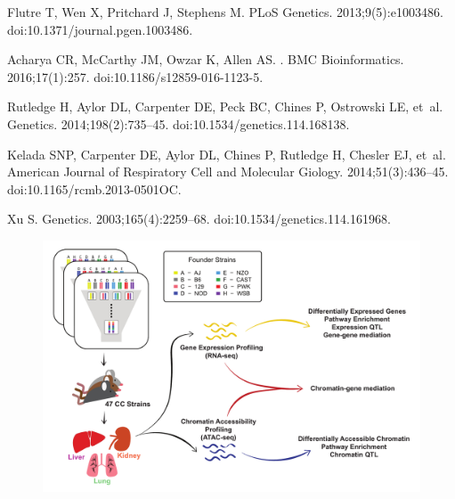 \documentclass[10pt,letterpaper]{article}
\begin{document}
\begin{thebibliography}{10}
Flutre T, Wen X, Pritchard J, Stephens M.
\newblock PLoS Genetics. 2013;9(5):e1003486.
\newblock doi:{10.1371/journal.pgen.1003486}.

Acharya CR, McCarthy JM, Owzar K, Allen AS.
.
\newblock BMC Bioinformatics. 2016;17(1):257.
\newblock doi:{10.1186/s12859-016-1123-5}.

Rutledge H, Aylor DL, Carpenter DE, Peck BC, Chines P, Ostrowski LE, et~al.
\newblock Genetics. 2014;198(2):735--45.
\newblock doi:{10.1534/genetics.114.168138}.

Kelada SNP, Carpenter DE, Aylor DL, Chines P, Rutledge H, Chesler EJ, et~al.
\newblock American Journal of Respiratory Cell and Molecular Giology.
  2014;51(3):436--45.
\newblock doi:{10.1165/rcmb.2013-0501OC}.

Xu S.
\newblock Genetics. 2003;165(4):2259--68.
\newblock doi:{10.1534/genetics.114.161968}.

\end{thebibliography}

\newpage

\setcounter{table}{0}
\setcounter{figure}{0}


\begin{figure}[hp]
\includegraphics[width=\linewidth, clip, trim={0in 0.1in 0in 0.2in}]{figs/overview_diagram_simplified.pdf}
\caption{}
\end{figure}
\end{document}
